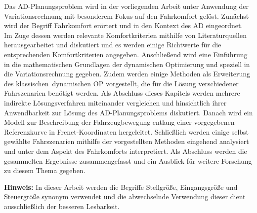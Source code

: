 Das \gls{AD}-Planungsproblem wird in der vorliegenden Arbeit unter Anwendung der Variationsrechnung mit besonderem Fokus auf den Fahrkomfort gelöst. Zunächst wird der Begriff Fahrkomfort erörtert und in den Kontext des \gls{AD} eingeordnet. Im Zuge dessen werden relevante Komfortkriterien mithilfe von Literaturquellen herausgearbeitet und diskutiert und es werden einige Richtwerte für die entsprechenden Komfortkriterien angegeben. Anschließend wird eine Einführung in die mathematischen Grundlagen der dynamischen Optimierung und speziell in die Variationsrechnung gegeben. Zudem werden einige Methoden als Erweiterung des \glqq klassischen\grqq~dynamischen \gls{OP} vorgestellt, die für die Lösung verschiedener Fahrszenarien benötigt werden. Als Abschluss dieses Kapitels werden mehrere indirekte Lösungsverfahren miteinander vergleichen und hinsichtlich ihrer Anwendbarkeit zur Lösung des \gls{AD}-Planungsproblems diskutiert. Danach wird ein Modell zur Beschreibung der Fahrzeugbewegung entlang einer vorgegebenen Referenzkurve in Frenet-Koordinaten hergeleitet. Schließlich werden einige selbst gewählte Fahrszenarien mithilfe der vorgestellten Methoden eingehend analysiert und unter dem Aspekt des Fahrkomforts interpretiert. Als Abschluss werden die gesammelten Ergebnisse zusammengefasst und ein Ausblick für weitere Forschung zu diesem Thema gegeben. 

\textbf{Hinweis:} In dieser Arbeit werden die Begriffe Stellgröße, Eingangsgröße und Steuergröße synonym verwendet und die abwechselnde Verwendung dieser dient ausschließlich der besseren Lesbarkeit. 



